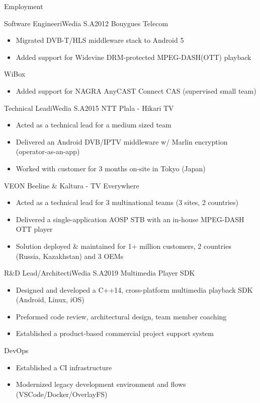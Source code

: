 \documentclass[]{mcdowellcv}
\begin{document}
	\makeheader

	\begin{cvsection}{Employment}
		\begin{cvsubsection}{Software Engineer}{iWedia S.A}{2012}
			Bouygues Telecom
			\begin{itemize}
				\item Migrated DVB-T/HLS middleware stack to Android 5
				\item Added support for Widevine DRM-protected MPEG-DASH(OTT) playback
			\end{itemize}
			WiBox
			\begin{itemize}
				\item Added support for NAGRA AnyCAST Connect CAS (supervised small team)
			\end{itemize}
		\end{cvsubsection}

		\begin{cvsubsection}{Technical Lead}{iWedia S.A}{2015}
			NTT Plala - Hikari TV
			\begin{itemize}
				\item Acted as a technical lead for a medium sized team
				\item Delivered an Android DVB/IPTV middleware w/ Marlin encryption (operator-as-an-app)
				\item Worked with customer for 3 months on-site in Tokyo (Japan)
			\end{itemize}
			VEON Beeline \& Kaltura - TV Everywhere
			\begin{itemize}
				\item Acted as a technical lead for 3 multinational teams (3 sites, 2 countries)
				\item Delivered a single-application AOSP STB with an in-house MPEG-DASH OTT player
				\item Solution deployed \& maintained for 1+ million customers, 2 countries (Russia, Kazakhstan) and 3 OEMs
			\end{itemize}
		\end{cvsubsection}

		\begin{cvsubsection}{R\&D Lead/Architect}{iWedia S.A}{2019}
			Multimedia Player SDK
			\begin{itemize}
				\item Designed and developed a C++14, cross-platform multimedia playback SDK (Android, Linux, iOS)
				\item Preformed code review, architectural design, team member coaching
				\item Established a product-based commercial project support system
			\end{itemize}
			DevOps
			\begin{itemize}
				\item Established a CI infrastructure
				\item Modernized legacy development environment and flows (VSCode/Docker/OverlayFS)
			\end{itemize}
		\end{cvsubsection}


\end{cvsection}
\end{document}
